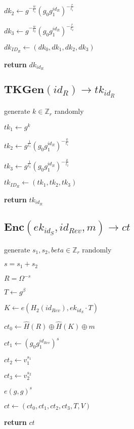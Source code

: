 \documentclass[a4paper]{article}
\begin{document}
$\textit{dk}_2 \gets g^{-\frac{w}{t_1}}(g_0 g_1^{\textit{id}_R})^{-\frac{r}{t_1}}$

$\textit{dk}_3 \gets g^{-\frac{w}{t_2}}(g_0 g_1^{\textit{id}_R})^{-\frac{r}{t_2}}$

$\textit{dk}_{\textit{ID}_R} \gets (\textit{dk}_0, \textit{dk}_1, \textit{dk}_2, \textit{dk}_3)$

\textbf{return} $\textit{dk}_{\textit{id}_R}$

\subsection{$\textbf{TKGen}(\textit{id}_R) \rightarrow \textit{tk}_{\textit{id}_R}$}

generate $k \in \mathbb{Z}_r$ randomly

$\textit{tk}_1 \gets g^k$

$\textit{tk}_2 \gets g^{\frac{1}{t_1}}(g_0 g_1^{\textit{id}_R})^{-\frac{k}{t_1}}$

$\textit{tk}_3 \gets g^{\frac{1}{t_2}}(g_0 g_1^{\textit{id}_R})^{-\frac{k}{t_2}}$

$\textit{tk}_{\textit{ID}_R} \gets (\textit{tk}_1, \textit{tk}_2, \textit{tk}_3)$

\textbf{return} $\textit{tk}_{\textit{id}_R}$

\subsection{$\textbf{Enc}(\textit{ek}_{\textit{id}_S}, \textit{id}_\textit{Rev}, m) \rightarrow \textit{ct}$}

generate $s_1, s_2, beta \in \mathbb{Z}_r$ randomly

$s = s_1 + s_2$

$R = \Omega^{-s}$

$T \gets g^\beta$

$K \gets e(H_2(\textit{id}_\textit{Rev}), \textit{ek}_{\textit{id}_S} \cdot T)$

$\textit{ct}_0 \gets \hat{H}(R) \oplus \hat{H}(K) \oplus m$

$\textit{ct}_1 \gets (g_0 g_1^{\textit{id}_\textit{Rev}})^s$

$\textit{ct}_2 \gets v_1^{s_1}$

$\textit{ct}_3 \gets v_2^{s_2}$

$e(g, g)^s$

$\textit{ct} \gets (\textit{ct}_0, \textit{ct}_1, \textit{ct}_2, \textit{ct}_3, T, V)$

\textbf{return} $\textit{ct}$
\end{document}

